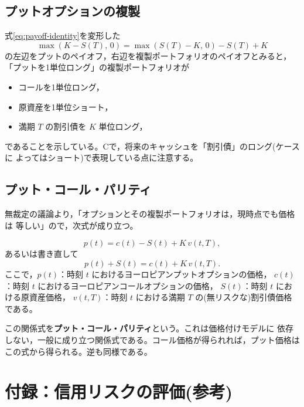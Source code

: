 \subsection{プットオプションの複製}

式\eqref{eq:payoff-identity}を変形した
\begin{equation}
\max(K - S(T),\,0) = \max(S(T)-K,\,0) - S(T) + K
\end{equation}
の左辺をプットのペイオフ，右辺を複製ポートフォリオのペイオフとみると，
「プットを1単位ロング」の複製ポートフォリオが
\begin{itemize}
\item[A.] コールを1単位ロング，
\item[B.] 原資産を1単位ショート，
\item[C.] 満期 $T$ の割引債を $K$ 単位ロング，
\end{itemize}
であることを示している。Cで，将来のキャッシュを「割引債」のロング(ケースに
よってはショート)で表現している点に注意する。

\subsection{プット・コール・パリティ}

無裁定の議論より，「オプションとその複製ポートフォリオは，現時点でも価格は
等しい」ので，次式が成り立つ。

\begin{theorem}
\begin{equation}
p(t) = c(t) - S(t) + K\,v(t,T),
\label{eq:put-call-parity}
\end{equation}
あるいは書き直して
\begin{equation}
p(t) + S(t) = c(t) + K\,v(t,T).
\end{equation}
ここで，$p(t)$：時刻 $t$ におけるヨーロピアンプットオプションの価格，
$c(t)$：時刻 $t$ におけるヨーロピアンコールオプションの価格，
$S(t)$：時刻 $t$ における原資産価格，
$v(t,T)$：時刻 $t$ における満期 $T$ の(無リスクな)割引債価格である。
\end{theorem}

この関係式を\textbf{プット・コール・パリティ}という。これは価格付けモデルに
依存しない，一般に成り立つ関係式である。コール価格が得られれば，プット価格は
この式から得られる。逆も同様である。

\section*{付録：信用リスクの評価(参考)}

